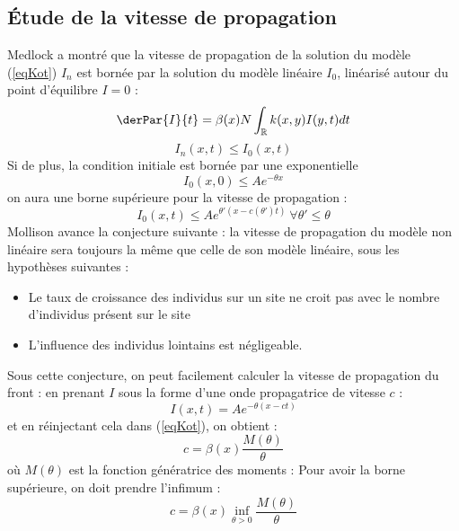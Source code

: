 \documentclass{article}
\begin{document}
\subsection{Étude de la vitesse de propagation}
\label{refVit}
Medlock \cite{KotMedlock03} a montré que la vitesse de propagation de la solution du modèle (\ref{eqKot}) $I_n$ est bornée par la solution du modèle linéaire $I_0$, linéarisé autour du point d'équilibre $I=0$ :
\begin{equation}\label{modLin}
\derPar{I}{t}=\beta(x)N\int_{\mathbb{R}}k(x,y)I(y,t) dt
\end{equation}
\[I_n(x,t)\leq I_0(x,t)\]
Si de plus, la condition initiale est bornée par une exponentielle \[I_0(x,0)\leq Ae^{-\theta x}\] on aura une borne supérieure pour la vitesse de propagation :
\begin{equation}\label{bornSup}
	I_0(x,t)\leq Ae^{\theta'(x-c(\theta')t)}\ \forall \theta'\leq \theta
\end{equation}
Mollison \cite{mollison1991dependence} avance la conjecture suivante : la vitesse de propagation du modèle non linéaire sera toujours la même que celle de son modèle linéaire, sous les hypothèses suivantes :
\begin{itemize}
	\item Le taux de croissance des individus sur un site ne croit pas avec le nombre d'individus présent sur le site
	\item L'influence des individus lointains est négligeable.
\end{itemize}
Sous cette conjecture, on peut facilement calculer la vitesse de propagation du front : en prenant $I$ sous la forme d'une onde propagatrice de vitesse $c$ :
	\[I(x,t)=Ae^{-\theta(x-ct)}\]
et en réinjectant cela dans (\ref{eqKot}), on obtient :
	\[c=\beta(x)\frac{M(\theta)}{\theta}\]
où $M(\theta)$ est la fonction génératrice des moments :
Pour avoir la borne supérieure, on doit prendre l'infimum :
\begin{equation}\label{bornVit}
	c=\beta(x)\inf_{\theta>0}\frac{M(\theta)}{\theta}
\end{equation}
\end{document}
